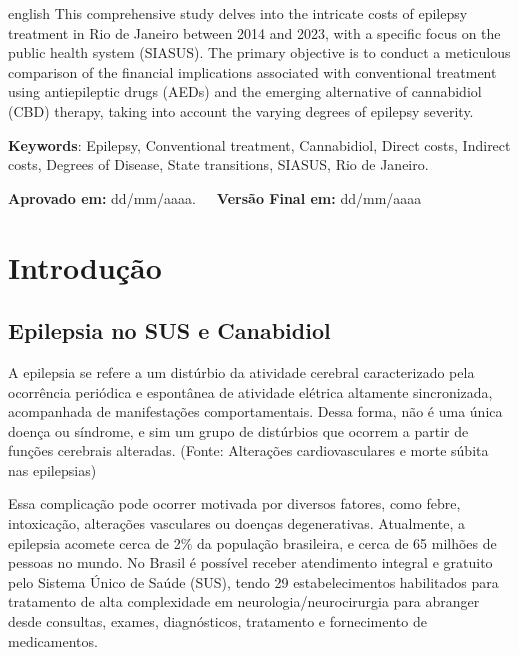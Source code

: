 \documentclass[article,a4paper,12pt,brazil,sumario=tradicional]{abntex2}
\begin{document}
\vspace{-.3cm}
\begin{hyphenrules}{english}
\noindent This comprehensive study delves into the intricate costs of epilepsy treatment in Rio de Janeiro between 2014 and 2023, with a specific focus on the public health system (SIASUS). The primary objective is to conduct a meticulous comparison of the financial implications associated with conventional treatment using antiepileptic drugs (AEDs) and the emerging alternative of cannabidiol (CBD) therapy, taking into account the varying degrees of epilepsy severity.
\end{hyphenrules}
\vspace{.4cm}
 
\noindent \textbf{Keywords}: Epilepsy, Conventional treatment, Cannabidiol, Direct costs, Indirect costs, Degrees of Disease, State transitions, SIASUS, Rio de Janeiro.

\vspace{.4cm}

\noindent \textbf{Aprovado em:} dd/mm/aaaa.~~~\textbf{Versão Final em:} dd/mm/aaaa

\section{Introdução}

\subsection{Epilepsia no SUS e Canabidiol}
A epilepsia se refere a um distúrbio da atividade cerebral caracterizado pela ocorrência periódica e espontânea de atividade elétrica altamente sincronizada, acompanhada de manifestações comportamentais. Dessa forma, não é uma única doença ou síndrome, e sim um grupo de distúrbios que ocorrem a partir de funções cerebrais alteradas. (Fonte: Alterações cardiovasculares e morte súbita nas epilepsias)

Essa complicação pode ocorrer motivada por diversos fatores, como febre, intoxicação, alterações vasculares ou doenças degenerativas. Atualmente, a epilepsia acomete cerca de 2\% da população brasileira, e cerca de 65 milhões de pessoas no mundo. No Brasil é possível receber atendimento integral e gratuito pelo Sistema Único de Saúde (SUS), tendo 29 estabelecimentos habilitados para tratamento de alta complexidade em neurologia/neurocirurgia para abranger desde consultas, exames, diagnósticos, tratamento e fornecimento de medicamentos.
\end{document}
